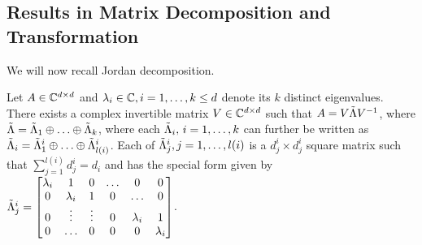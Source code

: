 \subsection{Results in Matrix Decomposition and Transformation}
We will now recall Jordan decomposition.
\begin{lemma}\label{Jordan}
Let $A\in \mathbb{C}^{d \times d}$ and $\lambda_i\in \mathbb{C},i=1,\ldots,k\leq d$ denote its $k$ distinct eigenvalues.
There exists a complex invertible matrix $V\in \mathbb{C}^{d \times d}$ such that $A=V\tilde{\Lambda} V^{-1}$, where
$\tilde{\Lambda}=\tilde{\Lambda}_1\oplus\ldots\oplus\tilde{\Lambda}_k$, where each $\tilde{\Lambda}_i,\,i=1,\ldots,k$ can further be written as $\tilde{\Lambda}_i= {\tilde{\Lambda}}^i_{1}\oplus \ldots \oplus {\tilde{\Lambda}}^i_{{l(i)}}$. Each of ${\tilde{\Lambda}}^i_{j},j=1,\ldots,l(i)$ is a $d^i_j\times d^i_j$ square matrix such that $\sum_{j=1}^{l(i)} d^i_j =d_i$ and has the special form given by
${\tilde{\Lambda}}^i_{j}=\begin{bmatrix} \lambda_i &1 &0 &\ldots &0 &0\\ 0 &\lambda_i &1 &0 &\ldots &0 \\ 0 &\vdots &\vdots &0 &\lambda_i &1 \\ 0 &\ldots &0 &0 &0 &\lambda_i \end{bmatrix}$.
\end{lemma}

